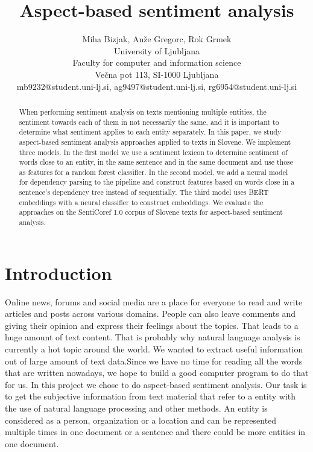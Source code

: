 \documentclass[11pt,a4paper]{article}
\title{Aspect-based sentiment analysis}
\author{
    Miha Bizjak, Anže Gregorc, Rok Grmek \\
    University of Ljubljana \\
    Faculty for computer and information science \\
    Večna pot 113, SI-1000 Ljubljana \\
    mb9232@student.uni-lj.si, ag9497@student.uni-lj.si, rg6954@student.uni-lj.si
}
\date{}
\begin{document}
\maketitle



\begin{abstract}
When performing sentiment analysis on texts mentioning multiple entities, the sentiment towards each of them in not necessarily the same, and it is important to determine what sentiment applies to each entity separately.
In this paper, we study aspect-based sentiment analysis approaches applied to texts in Slovene.
We implement three models. In the first model we use a sentiment lexicon to determine sentiment of words close to an entity, in the same sentence and in the same document and use those as features for a random forest classifier.
In the second model, we add a neural model for dependency parsing to the pipeline and construct features based on words close in a sentence's dependency tree instead of sequentially.
The third model uses BERT embeddings with a neural classifier to construct embeddings.
We evaluate the approaches on the SentiCoref 1.0 corpus of Slovene texts for aspect-based sentiment analysis.
\end{abstract}



\section{Introduction}

Online news, forums and social media are a place for everyone to read and write articles and posts across various domains.
People can also leave comments and giving their opinion and express their feelings about the topics.
That leads  to a huge amount of text content.
That is probably why natural language analysis is currently a hot topic around the world.
We wanted to extract useful information out of large amount of text data.Since we have no time for reading all the words that are written nowadays, we hope to build a good computer program to do that for us.
In this project we chose to do aspect-based sentiment analysis.
Our task is to get the subjective information from text material that refer to a entity with the use of natural language processing and other methods.
An entity is considered as a person, organization or a location and can be represented multiple times in one document or a sentence and there could be more entities in one document.
\end{document}
